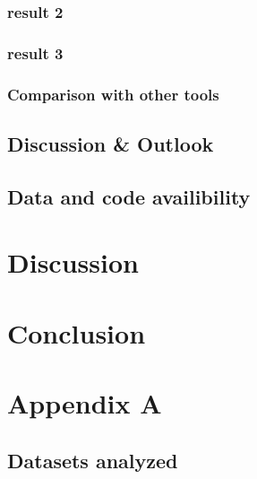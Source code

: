 \documentclass[12pt,twoside]{reedthesis}
\begin{document}
\hypertarget{result-2}{%
\subsection{result 2}\label{result-2}}

\hypertarget{result-3}{%
\subsection{result 3}\label{result-3}}

\hypertarget{comparison-with-other-tools}{%
\subsection{Comparison with other tools}\label{comparison-with-other-tools}}

\hypertarget{discussion-outlook}{%
\section{Discussion \& Outlook}\label{discussion-outlook}}

\hypertarget{data-and-code-availibility}{%
\section{Data and code availibility}\label{data-and-code-availibility}}

\hypertarget{discussion}{%
\chapter*{Discussion}\label{discussion}}

\hypertarget{conclusion}{%
\chapter*{Conclusion}\label{conclusion}}

\hypertarget{aa}{%
\chapter*{Appendix A}\label{aa}}

\hypertarget{datasets-analyzed}{%
\section{Datasets analyzed}\label{datasets-analyzed}}
\end{document}
